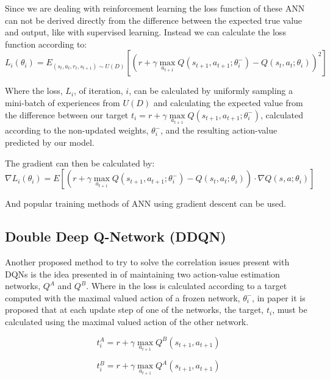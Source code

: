 Since we are dealing with reinforcement learning the loss function of these ANN can not be derived directly from the difference between the expected true value and output, like with supervised learning. Instead we can calculate the loss function according to:
\begin{equation}
    L_i(\theta_i) = E_{(s_t, a_t, r_t, s_{t+1})\sim U(D)} [(r+\gamma \max\limits_{a_{t+1}} Q(s_{t+1}, a_{t+1};\theta_i^-) - Q(s_t, a_t; \theta_i))^2]
\end{equation}

Where the loss, $L_i$, of iteration, $i$, can be calculated by uniformly sampling a mini-batch of experiences from $U(D)$ and calculating the expected value from the difference between our target $t_i=r+\gamma\max\limits_{a_{t+1}} Q(s_{t+1}, a_{t+1};\theta_i^-)$, calculated according to the non-updated weights, $\theta_i^-$, and the resulting action-value predicted by our model.

The gradient can then be calculated by:
\begin{equation}
\nabla L_i(\theta_i) = E [(r+\gamma \max\limits_{a_{t+1}} Q(s_{t+1}, a_{t+1};\theta_i^-) - Q(s_t, a_t; \theta_i))\cdot\nabla Q(s, a;\theta_i)]
\end{equation}

And popular training methods of ANN using gradient descent can be used.

\subsection{Double Deep Q-Network (DDQN)}
\noindent Another proposed method to try to solve the correlation issues present with \acrshort{DQN}s is the idea presented in \cite{doubleDQN} of maintaining two action-value estimation networks, $Q^A$ and $Q^B$. Where in \cite{DQN} the loss is calculated according to a target computed with the maximal valued action of a frozen network, $\theta_i^-$, in paper \cite{doubleDQN} it is proposed that at each update step of one of the networks, the target, $t_i$, must be calculated using the maximal valued action of the other network.

\begin{equation}
    t_i^A = r+\gamma\max\limits_{a_{t+1}}Q^B(s_{t+1}, a_{t+1})
\end{equation}

\begin{equation}
    t_i^B = r+\gamma\max\limits_{a_{t+1}}Q^A(s_{t+1}, a_{t+1})
\end{equation}


